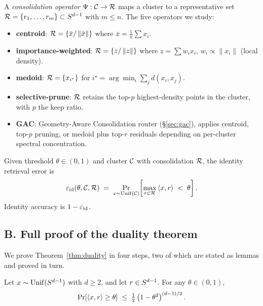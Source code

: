 \begin{definition}
A \emph{consolidation operator} $\Psi: \mathcal{C} \to \mathcal{R}$ maps
a cluster to a representative set $\mathcal{R} = \{r_1, \ldots, r_m\}
\subset S^{d-1}$ with $m \leq n$. The five operators we study:
\begin{itemize}
  \item \textbf{centroid}: $\mathcal{R} = \{\bar{x}/\left\lVert\bar{x}\right\rVert\}$ where
  $\bar{x} = \frac{1}{n}\sum x_i$.
  \item \textbf{importance-weighted}: $\mathcal{R} = \{z/\left\lVert z\right\rVert\}$ where
  $z = \sum w_i x_i$, $w_i \propto \|x_i\|$ (local density).
  \item \textbf{medoid}: $\mathcal{R} = \{x_{i^\star}\}$ for
  $i^\star = \arg\min_i \sum_j d(x_i, x_j)$.
  \item \textbf{selective-prune}: $\mathcal{R}$ retains the top-$p$
  highest-density points in the cluster, with $p$ the keep ratio.
  \item \textbf{GAC}: Geometry-Aware Consolidation router
  (\S\ref{sec:gac}), applies centroid, top-$p$ pruning, or medoid
  plus top-$r$ residuals depending on per-cluster spectral
  concentration.
\end{itemize}
\end{definition}

\begin{definition}
\label{def:id}
Given threshold $\theta \in (0,1)$ and cluster $\mathcal{C}$ with
consolidation $\mathcal{R}$, the identity retrieval error is
\[
\varepsilon_{\mathrm{id}}(\theta, \mathcal{C}, \mathcal{R}) \;=\;
\Pr_{x \sim \mathrm{Unif}(\mathcal{C})}\!\left[
\max_{r \in \mathcal{R}} \left\langle x,r\right\rangle \; < \; \theta \right].
\]
Identity accuracy is $1 - \varepsilon_{\mathrm{id}}$.
\end{definition}

\subsection*{B. Full proof of the duality theorem}
\label{sec:methods:proof}

We prove Theorem~\ref{thm:duality} in four steps, two of which are
stated as lemmas and proved in turn.

\begin{lemma}
\label{lem:cap}
Let $x \sim \mathrm{Unif}(S^{d-1})$ with $d \geq 2$, and let
$r \in S^{d-1}$. For any $\theta \in (0, 1)$,
\[
\Pr\!\left[\left\langle x,r\right\rangle \geq \theta\right] \;\leq\; \tfrac{1}{2}
\left(1 - \theta^2\right)^{(d-1)/2}.
\]
\end{lemma}


